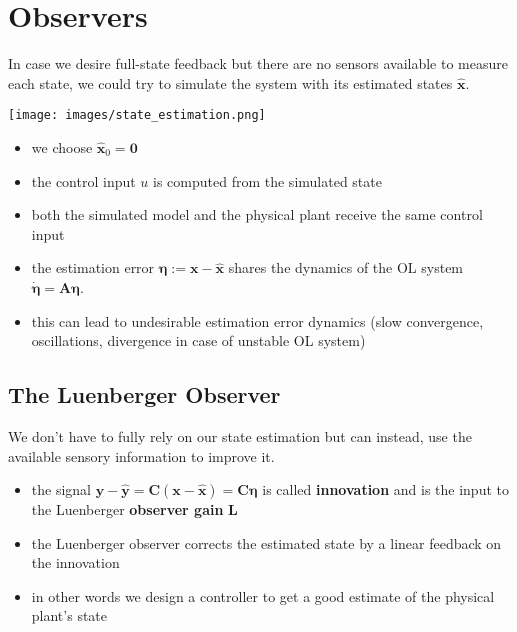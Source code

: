 \section{Observers}

In case we desire full-state feedback but there are no sensors available to measure each state, we could try to simulate the system with its estimated states $\hat{\mathbf{x}}$.

\begin{center}
    \texttt{[image: images/state\_estimation.png]}
\end{center}

\begin{itemize}
    \item we choose $\hat{\mathbf{x}}_0=\mathbf{0}$
    \item the control input $u$ is computed from the simulated state
    \item both the simulated model and the physical plant receive the same control input
\end{itemize}

\newpar{}

\begin{itemize}
    \item the estimation error $\boldsymbol{\eta}:=\mathbf{x}-\hat{\mathbf{x}}$ shares the dynamics of the OL system $\dot{\boldsymbol{\eta}}=\mathbf{A}\boldsymbol{\eta}$.
    \item this can lead to undesirable estimation error dynamics (slow convergence, oscillations, divergence in case of unstable OL system)
\end{itemize}

\subsection{The Luenberger Observer}
We don't have to fully rely on our state estimation but can instead, use the available sensory information to improve it.
\begin{itemize}
    \item the signal $\mathbf{y}-\hat{\mathbf{y}}=\mathbf{C}(\mathbf{x}-\hat{\mathbf{x}}) = \mathbf{C}\boldsymbol{\eta}$ is called \textbf{innovation} and is the input to the Luenberger \textbf{observer gain} $\mathbf{L}$
    \item the Luenberger observer corrects the estimated state by a linear feedback on the innovation
    \item in other words we design a controller to get a good estimate of the physical plant's state
\end{itemize}

